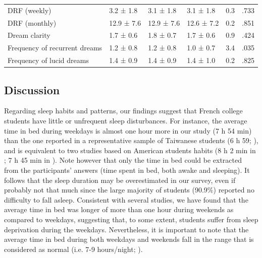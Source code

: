 \begin{table}[!htbp]
\begin{tabularx}{\textwidth}{bXXXll}
    DRF (weekly)                   & 3.2 ± 1.8  & 3.1 ± 1.8  & 3.1 ± 1.8  & 0.3    & .733 \\
    DRF (monthly)                  & 12.9 ± 7.6 & 12.9 ± 7.6 & 12.6 ± 7.2 & 0.2    & .851 \\
    Dream clarity                  & 1.7 ± 0.6  & 1.8 ± 0.7  & 1.7 ± 0.6  & 0.9    & .424 \\
    Frequency of recurrent dreams  & 1.2 ± 0.8  & 1.2 ± 0.8  & 1.0 ± 0.7  & 3.4    & .035 \\
    Frequency of lucid dreams      & 1.4 ± 0.9  & 1.4 ± 0.9  & 1.4 ± 1.0  & 0.2    & .825 \\ \bottomrule
    \end{tabularx}
\end{table}

\FloatBarrier

\subsection*{Discussion}
\label{res:survey:discussion}

Regarding sleep habits and patterns, our findings suggest that French college students have little or unfrequent sleep disturbances. For instance, the average time in bed during weekdays is almost one hour more in our study (7 h 54 min) than the one reported in a representative sample of Taiwanese students (6 h 59; \citealp{tsai_sleep_2004}), and is equivalent to two studies based on American students habits (8 h 2 min in \citealp{buboltz_sleep_2001}; 7 h 45 min in \citealp{lund_sleep_2010}). Note however that only the time in bed could be extracted from the participants’ answers (time spent in bed, both awake and sleeping). It follows that the sleep duration may be overestimated in our survey, even if probably not that much since the large majority of students (90.9\%) reported no difficulty to fall asleep. Consistent with several studies, we have found that the average time in bed was longer of more than one hour during weekends as compared to weekdays, suggesting that, to some extent, students suffer from sleep deprivation during the weekdays. Nevertheless, it is important to note that the average time in bed during both weekdays and weekends fall in the range that is considered as normal (i.e. 7-9 hours/night; \citealp{hirshkowitz_normal_2004}).

